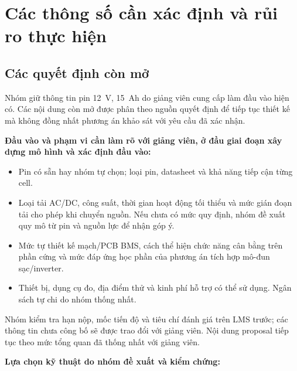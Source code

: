 \section{Các thông số cần xác định và rủi ro thực hiện}

\subsection{Các quyết định còn mở}
\label{sec:open-decisions}

Nhóm giữ thông tin pin 12~V, 15~Ah do giảng viên cung cấp làm đầu vào hiện có. Các nội dung còn mở được phân theo nguồn quyết định để tiếp tục thiết kế mà không đồng nhất phương án khảo sát với yêu cầu đã xác nhận.

\textbf{Đầu vào và phạm vi cần làm rõ với giảng viên, ở đầu giai đoạn xây dựng mô hình và xác định đầu vào:}
\begin{itemize}
    \item Pin có sẵn hay nhóm tự chọn; loại pin, datasheet và khả năng tiếp cận từng cell.
    \item Loại tải AC/DC, công suất, thời gian hoạt động tối thiểu và mức gián đoạn tải cho phép khi chuyển nguồn. Nếu chưa có mức quy định, nhóm đề xuất quy mô từ pin và nguồn lực để nhận góp ý.
    \item Mức tự thiết kế mạch/PCB BMS, cách thể hiện chức năng cân bằng trên phần cứng và mức đáp ứng học phần của phương án tích hợp mô-đun sạc/inverter.
    \item Thiết bị, dụng cụ đo, địa điểm thử và kinh phí hỗ trợ có thể sử dụng. Ngân sách tự chi do nhóm thống nhất.
\end{itemize}

Nhóm kiểm tra hạn nộp, mốc tiến độ và tiêu chí đánh giá trên LMS trước; các thông tin chưa công bố sẽ được trao đổi với giảng viên. Nội dung proposal tiếp tục theo mức tổng quan đã thống nhất với giảng viên.

\textbf{Lựa chọn kỹ thuật do nhóm đề xuất và kiểm chứng:}

